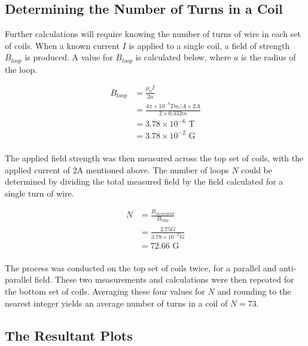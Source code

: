 \documentclass[a4paper]{article}
\begin{document}
\subsection{Determining the Number of Turns in a Coil}

\qq Further calculations will require knowing the number of turns of wire in
each set of coils. When a known current $I$ is applied to a single coil, a field
of strength $B_{loop}$ is produced. A value for $B_{loop}$ is calculated below,
where $a$ is the radius of the loop.

\begin{align*}
B_{loop} &= \frac{\mu_0 I}{2a} \\
         &= \frac{4 \pi \times 10^{-7} Tm/A \times 2A}{2\times 0.332m} \\
         &= 3.78 \times 10^{-6} \text{ T} \\
         &= 3.78 \times 10^{-2} \text{ G} \\
\end{align*}

\qq The applied field strength was then measured across the top set of coils, with
the applied current of 2A mentioned above. The number of loops $N$ could be
determined by dividing the total measured field by the field calculated for a
single turn of wire.

\begin{align*}
N &= \frac{B_{measured}}{B_{loop}} \\
  &= \frac{2.75G}{3.78 \times 10^{-2}G} \\
  &= 72.66 \text{ G} \\
\end{align*}

\qq The process was conducted on the top set of coils twice, for a parallel and
anti-parallel field. These two measurements and calculations were then repeated
for the bottom set of coils. Averaging these four values for $N$ and rounding to
the nearest integer yields an average number of turns in a coil of $N=73$.

\subsection{The Resultant Plots}
\end{document}

